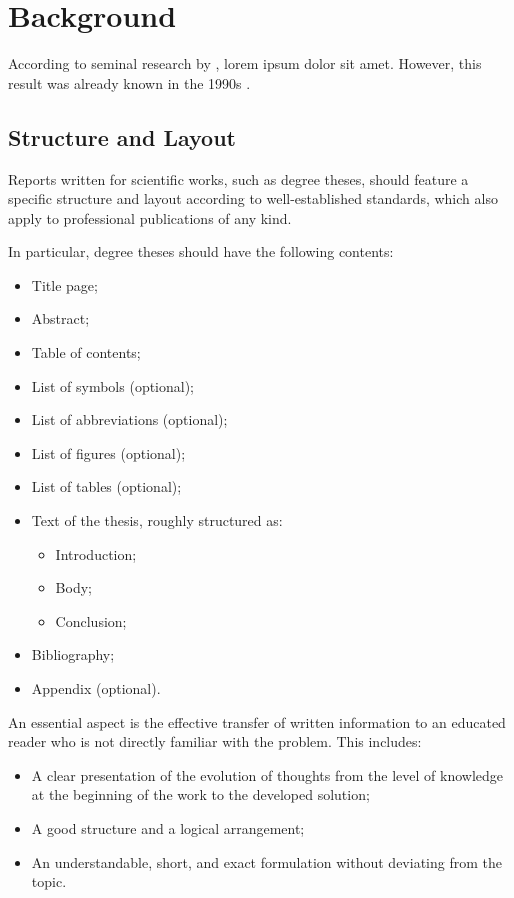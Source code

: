 \chapter{Background}

According to seminal research by \cite{krizhevsky2012imagenet}, lorem ipsum dolor sit amet. However, this result was already known in the 1990s \cite{lecun1998gradient}. 

\section{Structure and Layout}

Reports written for scientific works, such as degree theses, should feature a specific structure and layout according to well-established standards, which also apply to professional publications of any kind.

In particular, degree theses should have the following contents:
\begin{itemize}
	\item Title page;
	\item Abstract;
	\item Table of contents;
	\item List of symbols (optional);
	\item List of abbreviations (optional);
	\item List of figures (optional);
	\item List of tables (optional);
	\item Text of the thesis, roughly structured as:
	\begin{itemize}
		\item Introduction;
		\item Body;
		\item Conclusion;
	\end{itemize}
	\item Bibliography;
	\item Appendix (optional).
\end{itemize}

An essential aspect is the effective transfer of written information to an educated reader who is not directly familiar with the problem. This includes:
\begin{itemize}
  \item A clear presentation of the evolution of thoughts from the level of knowledge at the beginning of the work to the developed solution;
  \item A good structure and a logical arrangement;
  \item An understandable, short, and exact formulation without deviating from the topic.
\end{itemize}

